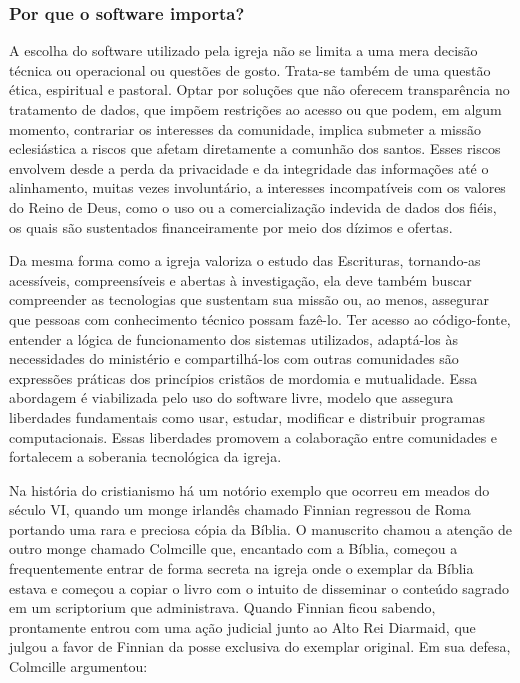 \subsubsection{Por que o software importa?}

A escolha do software utilizado pela igreja não se limita a uma mera decisão técnica ou operacional ou questões de gosto. Trata-se também de uma questão ética, espiritual e pastoral. Optar por soluções que não oferecem transparência no tratamento de dados, que impõem restrições ao acesso ou que podem, em algum momento, contrariar os interesses da comunidade, implica submeter a missão eclesiástica a riscos que afetam diretamente a comunhão dos santos. Esses riscos envolvem desde a perda da privacidade e da integridade das informações até o alinhamento, muitas vezes involuntário, a interesses incompatíveis com os valores do Reino de Deus, como o uso ou a comercialização indevida de dados dos fiéis, os quais são sustentados financeiramente por meio dos dízimos e ofertas.

Da mesma forma como a igreja valoriza o estudo das Escrituras, tornando-as acessíveis, compreensíveis e abertas à investigação, ela deve também buscar compreender as tecnologias que sustentam sua missão ou, ao menos, assegurar que pessoas com conhecimento técnico possam fazê-lo. Ter acesso ao código-fonte, entender a lógica de funcionamento dos sistemas utilizados, adaptá-los às necessidades do ministério e compartilhá-los com outras comunidades são expressões práticas dos princípios cristãos de mordomia e mutualidade. Essa abordagem é viabilizada pelo uso do software livre, modelo que assegura liberdades fundamentais como usar, estudar, modificar e distribuir programas computacionais. Essas liberdades promovem a colaboração entre comunidades e fortalecem a soberania tecnológica da igreja.

Na história do cristianismo há um notório exemplo que ocorreu em meados do século VI, quando um monge irlandês chamado Finnian regressou de Roma portando uma rara e preciosa cópia da Bíblia. O manuscrito chamou a atenção de outro monge chamado Colmcille que, encantado com a Bíblia, começou a frequentemente entrar de forma secreta na igreja onde o exemplar da Bíblia estava e começou a copiar o livro com o intuito de disseminar o conteúdo sagrado em um \foreignlanguage{latin}{scriptorium} que administrava. Quando Finnian ficou sabendo, prontamente entrou com uma ação judicial junto ao Alto Rei Diarmaid, que julgou a favor de Finnian da posse exclusiva do exemplar original. Em sua defesa, Colmcille argumentou:

